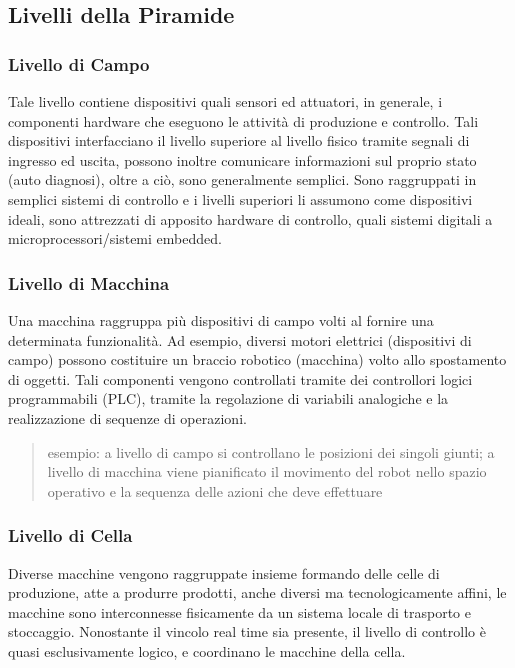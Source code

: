 \documentclass[10pt, letterpaper]{report}
\begin{document}
\subsection{Livelli della Piramide}
\subsubsection{Livello di Campo}
Tale livello contiene dispositivi quali sensori ed attuatori, in generale,  i componenti hardware che 
eseguono le attività di produzione e controllo. Tali dispositivi interfacciano il livello superiore al livello 
fisico tramite segnali di ingresso ed uscita, possono inoltre comunicare informazioni sul proprio 
stato (auto diagnosi), oltre a ciò, sono generalmente semplici.\acc 
Sono raggruppati in semplici sistemi di controllo e i livelli superiori li assumono come dispositivi 
ideali, sono attrezzati di apposito hardware di controllo, quali sistemi digitali a microprocessori/sistemi 
embedded.
\subsubsection{Livello di Macchina}
Una macchina raggruppa più dispositivi di campo volti al fornire una determinata funzionalità. Ad esempio, 
diversi motori elettrici (dispositivi di campo) possono costituire un braccio robotico (macchina) volto allo 
spostamento di oggetti.\acc 
Tali componenti vengono controllati tramite dei controllori logici programmabili (PLC), tramite la regolazione 
di variabili analogiche e la realizzazione di sequenze di operazioni.\begin{quote}
    \color{gray}
    esempio: a livello di campo si controllano le posizioni dei singoli giunti; a livello di macchina 
viene pianificato il movimento del robot nello spazio operativo e la sequenza delle azioni che 
deve effettuare
\color{black}\end{quote}
\subsubsection{Livello di Cella}
Diverse macchine vengono raggruppate insieme formando delle celle di produzione, atte a produrre prodotti, anche 
diversi ma tecnologicamente affini, le macchine sono interconnesse fisicamente da un sistema locale di trasporto 
e stoccaggio. Nonostante il vincolo real time sia presente, il livello di controllo è quasi 
esclusivamente logico, e coordinano le macchine della cella. 
\end{document}

